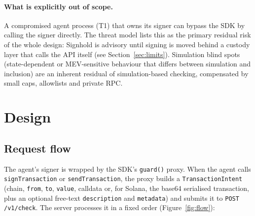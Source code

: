 \documentclass[10pt]{article}
\newcommand{\code}[1]{{\def\_{\char`\_\allowbreak}\texttt{#1}}}
\begin{document}
\paragraph{What is explicitly out of scope.} A compromised agent process (T1) that owns its signer can bypass the SDK by calling the signer directly. The threat model lists this as the primary residual risk of the whole design: Signhold is advisory until signing is moved behind a custody layer that calls the API itself (see Section~\ref{sec:limits}). Simulation blind spots (state-dependent or MEV-sensitive behaviour that differs between simulation and inclusion) are an inherent residual of simulation-based checking, compensated by small caps, allowlists and private RPC.

\section{Design}
\label{sec:design}

\subsection{Request flow}
\label{sec:flow}

The agent's signer is wrapped by the SDK's \code{guard()} proxy. When the agent calls \code{signTransaction} or \code{sendTransaction}, the proxy builds a \code{TransactionIntent} (chain, \code{from}, \code{to}, \code{value}, calldata or, for Solana, the base64 serialised transaction, plus an optional free-text \code{description} and \code{metadata}) and submits it to \code{POST /v1/check}. The server processes it in a fixed order (Figure~\ref{fig:flow}):
\end{document}
